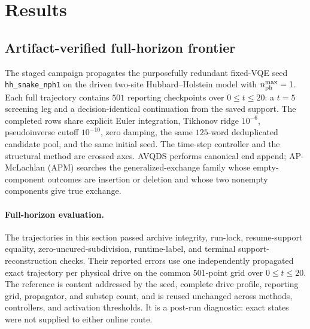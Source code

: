 \documentclass[
  reprint,
  amsmath,
  amssymb,
  aps,
  pra,
  nofootinbib,
  superscriptaddress,
  floatfix
]{revtex4-2}
\begin{document}
\section{Results}
\label{sec:results}
\label{sec:benchmarks}

\subsection{Artifact-verified full-horizon frontier}
\label{sec:comparison_protocol}
\label{sec:comparator}

The staged campaign propagates the purposefully redundant fixed-VQE seed
\texttt{hh\_snake\_nph1} on the driven two-site Hubbard--Holstein model with
\(n_{\rm ph}^{\max}=1\).  Each full trajectory contains \(501\) reporting
checkpoints over \(0\le t\le20\): a \(t=5\) screening leg and a
decision-identical continuation from the saved support.  The completed rows
share explicit Euler integration, Tikhonov ridge \(10^{-6}\), pseudoinverse
cutoff \(10^{-10}\), zero damping, the same \(125\)-word deduplicated candidate
pool, and the same initial seed.  The time-step controller and the structural
method are crossed axes.  AVQDS performs canonical end append; AP-McLachlan
(APM) searches the generalized-exchange family whose empty-component outcomes
are insertion or deletion and whose two nonempty components give true
exchange.

\paragraph*{Full-horizon evaluation.}
The trajectories in this section passed archive integrity, run-lock,
resume-support equality, zero-uncured-subdivision, runtime-label, and terminal
support-reconstruction checks.  Their reported errors use one independently
propagated exact trajectory per physical drive on the common 501-point grid
over $0\le t\le20$.  The reference is content addressed by the seed, complete
drive profile, reporting grid, propagator, and substep count, and is reused
unchanged across methods, controllers, and activation thresholds.  It is a
post-run diagnostic: exact states were not supplied to either online route.
\end{document}
